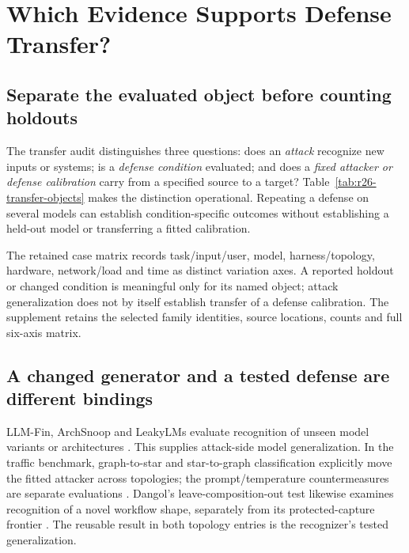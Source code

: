 \section{Which Evidence Supports Defense Transfer?}\label{sec:evaluation}\label{sec:threats}
\subsection{Separate the evaluated object before counting holdouts}
The transfer audit distinguishes three questions: does an \emph{attack} recognize new inputs or systems; is a \emph{defense condition} evaluated; and does a \emph{fixed attacker or defense calibration} carry from a specified source to a target? Table~\ref{tab:r26-transfer-objects} makes the distinction operational. Repeating a defense on several models can establish condition-specific outcomes without establishing a held-out model or transferring a fitted calibration.


The retained case matrix records task/input/user, model, harness/topology, hardware, network/load and time as distinct variation axes. A reported holdout or changed condition is meaningful only for its named object; attack generalization does not by itself establish transfer of a defense calibration. The supplement retains the selected family identities, source locations, counts and full six-axis matrix.

\subsection{A changed generator and a tested defense are different bindings}
LLM-Fin, ArchSnoop and LeakyLMs evaluate recognition of unseen model variants or architectures \cite{nazari2024llmfin,weng2026archsnoop,majidi2026leakylms}. This supplies attack-side model generalization. In the traffic benchmark, graph-to-star and star-to-graph classification explicitly move the fitted attacker across topologies; the prompt/temperature countermeasures are separate evaluations \cite[V-B--C]{pouryousef2026traffic}. Dangol's leave-composition-out test likewise examines recognition of a novel workflow shape, separately from its protected-capture frontier \cite[9.8--9.12]{dangol2026workflow}. The reusable result in both topology entries is the recognizer's tested generalization.

